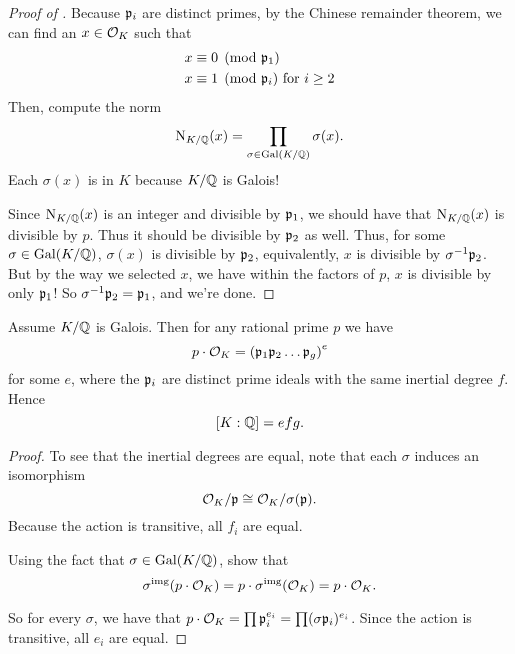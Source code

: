 \begin{proof}
	[Proof of ]
	Because $\mathfrak p_i$ are distinct primes, by the Chinese remainder theorem,
	we can find an $x \in \mathcal O_K$ such that
	\begin{align*}
		x &\equiv 0 \pmod{\mathfrak p_1} \\
		x &\equiv 1 \pmod{\mathfrak p_i} \text{ for $i \ge 2$}
	\end{align*}
	Then, compute the norm
	\[ \operatorname{N}_{K/\mathbb Q}(x) = \prod_{\sigma \in \operatorname{Gal}(K/\mathbb Q)} \sigma(x). \]
	Each $\sigma(x)$ is in $K$ because $K/\mathbb Q$ is Galois!

	Since $\operatorname{N}_{K/\mathbb Q}(x)$ is an integer and divisible by $\mathfrak p_1$,
	we should have that $\operatorname{N}_{K/\mathbb Q}(x)$ is divisible by $p$.
	Thus it should be divisible by $\mathfrak p_2$ as well.
	Thus, for some $\sigma \in \operatorname{Gal}(K/\mathbb Q)$, $\sigma(x)$ is divisible by
	$\mathfrak p_2$, equivalently, $x$ is divisible by $\sigma^{-1}\mathfrak p_2$.
	But by the way we selected $x$, we have within the factors of $p$, $x$ is
	divisible by only $\mathfrak p_1$!
	So $\sigma^{-1}\mathfrak p_2 = \mathfrak p_1$, and we're done.
\end{proof}

\begin{theorem}
	Assume $K/\mathbb Q$ is Galois.
	Then for any rational prime $p$ we have
	\[ p \cdot \mathcal O_K = \left( \mathfrak p_1 \mathfrak p_2 \dots \mathfrak p_g \right)^e \]
	for some $e$, where the $\mathfrak p_i$ are distinct prime ideals
	with the same inertial degree $f$.
	Hence \[ [K:\mathbb Q] = efg. \]
\end{theorem}
\begin{proof}
	To see that the inertial degrees are equal, note that each $\sigma$
	induces an isomorphism
	\[ \mathcal O_K / \mathfrak p \cong \mathcal O_K / \sigma(\mathfrak p). \]
	Because the action is transitive, all $f_i$ are equal.
	\begin{exercise}
		Using the fact that $\sigma \in \operatorname{Gal}(K/\mathbb Q)$,
		show that \[ \sigma^{\text{img}}(p \cdot \mathcal O_K) = p \cdot \sigma^{\text{img}}(\mathcal O_K) = p \cdot \mathcal O_K. \]
	\end{exercise}
	So for every $\sigma$, we have that
	$p \cdot \mathcal O_K = \prod \mathfrak p_i^{e_i} = \prod (\sigma\mathfrak p_i)^{e_i}$.
	Since the action is transitive, all $e_i$ are equal.
\end{proof}

